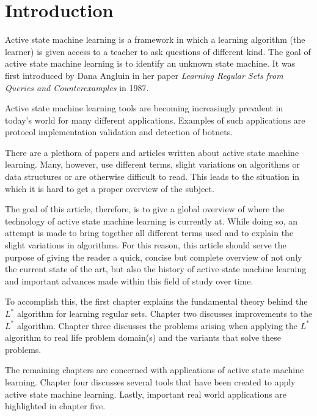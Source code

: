 \documentclass[multi,crop=false,class=article]{standalone}
\begin{document}
\section*{Introduction}
\label{sec:introduction}

Active state machine learning is a framework in which a learning algorithm (the
learner) is given access to a teacher to ask questions of different kind. The
goal of active state machine learning is to identify an unknown state machine.
It was first introduced by Dana Angluin in her paper \textit{Learning Regular
Sets from Queries and Counterexamples} in 1987\cite{Angluin1987}.

Active state machine learning tools are becoming increasingly prevalent in
today's world for many different applications.  Examples
of such applications are protocol implementation validation and detection of
botnets. 

There are a plethora of papers and articles written about active state machine
learning. Many, however, use different terms, slight variations on algorithms
or data structures or are otherwise difficult to read. This leads to the
situation in which it is hard to get a proper overview of the subject.

The goal of this article, therefore, is to give a global overview of where the
technology of active state machine learning is currently at. While doing so, an
attempt is made to bring together all different terms used and to explain the
slight variations in algorithms. For this reason, this article should serve the
purpose of giving the reader a quick, concise but complete overview of not only
the current state of the art, but also the history of active state machine
learning and important advances made within this field of study over time.

To accomplish this, the first chapter explains the fundamental theory behind the
$L^{*}$ algorithm for learning regular sets. Chapter two discusses improvements
to the $L^{*}$ algorithm. Chapter three discusses the problems arising when
applying the $L^{*}$ algorithm to real life problem domain(s) and the variants
that solve these problems.

The remaining chapters are concerned with applications of active state machine
learning. Chapter four discusses several tools that have been created to apply
active state machine learning. Lastly, important real world applications are
highlighted in chapter five.
\end{document}
